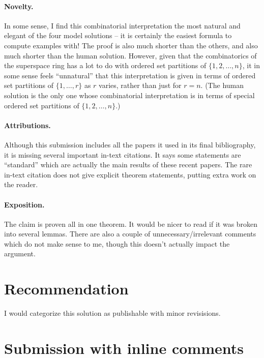 \documentclass[12pt]{article}
\begin{document}
\paragraph{Novelty.}  In some sense, I find this combinatorial interpretation the most natural and elegant of the four model solutions -- it is certainly the easiest formula to compute examples with! The proof is also much shorter than the others, and also much shorter than the human solution. However, given that the combinatorics of the superspace ring has a lot to do with ordered set partitions of $\{1, 2, \ldots, n\}$, it in some sense feels ``unnatural'' that this interpretation is given in terms of ordered set partitions of $\{1, \ldots, r\}$ as $r$ varies, rather than just for $r = n$. (The human solution is the only one whose combinatorial interpretation is in terms of special ordered set partitions of $\{1, 2, \ldots, n\}.$)

\paragraph{Attributions.} Although this submission includes  all  the papers it used in its final bibliography, it is missing several important in-text citations. It says some statements are ``standard'' which are actually the main results of these recent papers. The rare in-text citation does not give explicit theorem statements,  putting extra work on the reader.

\paragraph{Exposition.} The claim is proven all in one theorem. It would be nicer to read if it was broken into several lemmas. There are also a couple of unnecessary/irrelevant comments which do not make sense to me, though this doesn't actually impact the argument.

\section{Recommendation}


I would categorize this solution as publishable with minor revisisions.


  \section{Submission with inline comments}

%
\date{}
\end{document}
